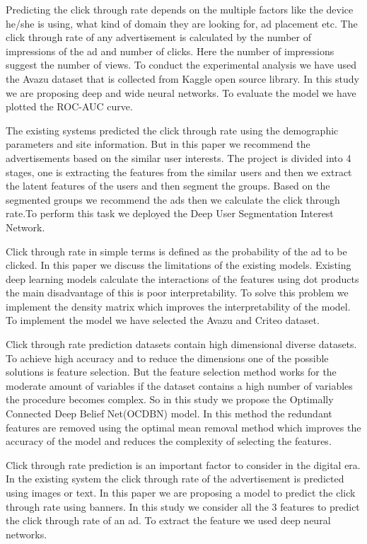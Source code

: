 \documentclass[conference]{IEEEtran}
\begin{document}
Predicting the click through rate depends on the multiple factors like the device he/she is using, what kind of domain they are looking for, ad placement etc. The click through rate of any advertisement is calculated by the number of impressions of the ad and number of clicks. Here the number of impressions suggest the number of views. To conduct the experimental analysis we have used the Avazu dataset that is collected from Kaggle open source library. In this study we are proposing deep and wide neural networks. To evaluate the model we have plotted the ROC-AUC curve\cite{9316682}\cite{8456499}.

The existing systems predicted the click through rate using the demographic parameters and site information. But in this paper we recommend the advertisements based on the similar user interests. The project is divided into 4 stages, one is extracting the features from the similar users and then we extract the latent features of the users and then segment the groups. Based on the segmented groups we recommend the ads then we calculate the click through rate.To perform this task we deployed the Deep User Segmentation Interest Network\cite{9137448}.

Click through rate in simple terms is defined as the probability of the ad to be clicked. In this paper we discuss the limitations of the existing models. Existing deep learning models calculate the interactions of the features  using dot products the main disadvantage of this is poor interpretability. To solve this problem we implement the density matrix which improves the interpretability of the model. To implement the model we have selected the Avazu and Criteo dataset\cite{8430515}.

 Click through rate prediction datasets contain high dimensional diverse datasets. To achieve high accuracy and to reduce the dimensions one of the possible solutions is feature selection. But the feature selection method works for the moderate amount of variables if the dataset contains a high number of variables the procedure becomes complex. So in this study we propose the Optimally Connected Deep Belief Net(OCDBN) model. In this method the redundant features are removed using the optimal mean removal method which improves the accuracy of the model and reduces the complexity of selecting the features\cite{8919379}\cite{10066174}.

Click through rate prediction is an important factor to consider in the digital era. In the existing system the click through rate of the advertisement is predicted using images or text. In this paper we are proposing a model to predict the click through rate using banners. In this study we consider all the 3 features to predict the click through rate of an ad. To extract the feature we used deep neural networks\cite{9244149}.
\end{document}
